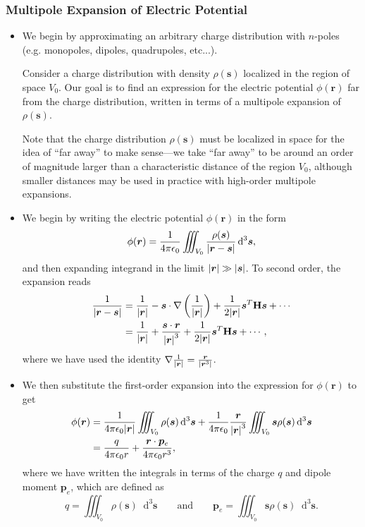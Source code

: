 \documentclass[11pt, a4paper]{article}
\newcommand{\diff}{\mathop{}\!\mathrm{d}} %
\newcommand{\eqtext}[1]{\qquad \text{#1} \qquad}
\renewcommand{\vec}[1]{\bm{#1}} %
\newcommand{\mat}[1]{\mathbf{#1}} %
\renewcommand{\r}{\vec{r}}
\newcommand{\ee}{\epsilon_{0}}  %
\newcommand{\pe}{\vec{p}_{e}}  %
\newcommand{\s}{\vec{s}}  %
\newcommand{\ds}{\diff^{3} \s}  %
\renewcommand{\grad}{\nabla}
\begin{document}
\subsubsection{Multipole Expansion of Electric Potential}
\begin{itemize}
	\item We begin by approximating an arbitrary charge distribution with $ n $-poles (e.g. monopoles, dipoles, quadrupoles, etc...).
	
    Consider a charge distribution with density $ \rho(\s) $ localized in the region of space $ V_{0} $. Our goal is to find an expression for the electric potential $ \phi(\r) $ far from the charge distribution, written in terms of a multipole expansion of $ \rho(\s) $.
	
    Note that the charge distribution $ \rho(\s) $ must be localized in space for the idea of ``far away'' to make sense---we take ``far away'' to be around an order of magnitude larger than a characteristic distance of the region $ V_{0} $, although smaller distances may be used in practice with high-order multipole expansions.

    \item We begin by writing the electric potential $ \phi(\r) $ in the form
	\begin{equation*}
		\phi(\r) = \frac{1}{4\pi \ee}\iiint_{V_{0}}\frac{\rho(\s)}{\abs{\r - \s}} \ds,
	\end{equation*}
    and then expanding integrand in the limit $ \abs{\r} \gg \abs{\s}  $. To second order, the expansion reads
	\begin{align*}
        \frac{1}{\abs{\r - \s}} &= \frac{1}{\abs{\r}} - \s \cdot \grad\left(\frac{1}{\abs{\r}}\right) + \frac{1}{2\abs{\r}} \s^{T}\mat{H}\s + \cdots\\
        &= \frac{1}{\abs{\r}} + \frac{\s \cdot \r}{\abs{\r}^{3}} + \frac{1}{2\abs{\r}} \s^{T}\mat{H}\s + \cdots,
	\end{align*}
    where we have used the identity $ \grad \frac{1}{\abs{\r}} = \frac{\r}{\abs{\r^{3}}} $.

    \item We then substitute the first-order expansion into the expression for $ \phi(\r) $ to get
	\begin{align*}
		\phi(\r) &= \frac{1}{4\pi \ee \abs{\r}}\iiint_{V_{0}} \rho(\s) \ds + \frac{1}{4\pi \ee}\frac{\r}{\abs{\r}^{3}}\iiint_{V_{0}} \s \rho(\s)\ds\\
		& = \frac{q}{4\pi \ee r} + \frac{\r \cdot \pe}{4\pi \ee r^{3}},
	\end{align*}
    where we have written the integrals in terms of the charge $ q $ and dipole moment $ \pe $, which are defined as
	\begin{equation*}
		q = \iiint_{V_{0}} \rho(\s) \ds \eqtext{and} \pe = \iiint_{V_{0}} \s \rho(\s) \ds.
	\end{equation*}
	

\end{itemize}
\end{document}
